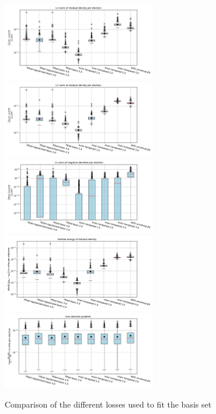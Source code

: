 \begin{figure}
    \centering
    \includegraphics[width=0.6\textwidth]{chapters/results/results_images/L2_residual_densities_on_hartree+external_MOFDFT_for_different_basis_sets}
    \includegraphics[width=0.6\textwidth]{chapters/results/results_images/L1_residual_densities_on_hartree+external_MOFDFT_for_different_basis_sets}
    \includegraphics[width=0.6\textwidth]{chapters/results/results_images/L1_negative_densities_on_hartree+external_MOFDFT_for_different_basis_sets}
    \includegraphics[width=0.6\textwidth]{chapters/results/results_images/L2_residual_hartree_on_hartree+external_MOFDFT_for_different_basis_sets}
    \includegraphics[width=0.6\textwidth]{chapters/results/results_images/max_abs_gradient_on_hartree+external_MOFDFT_for_different_basis_sets}
    \caption{Comparison of the different losses used to fit the basis set}
\end{figure}


